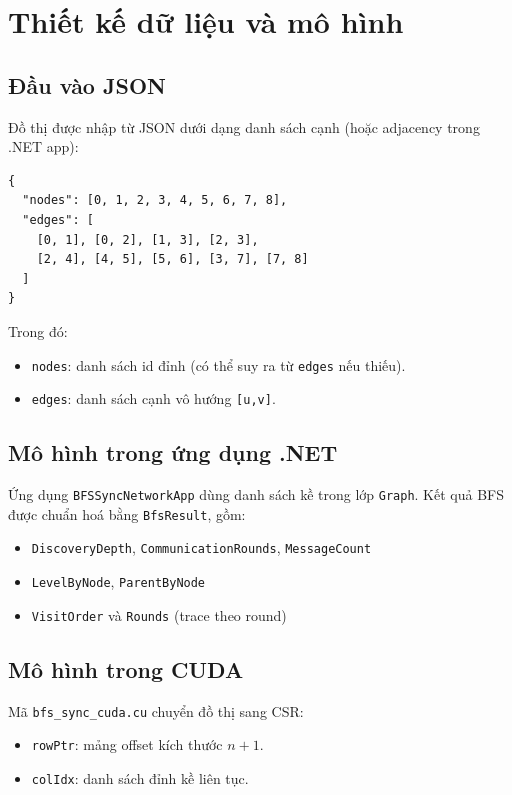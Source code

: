 \documentclass[12pt,a4paper]{article}
\begin{document}
\section{Thiết kế dữ liệu và mô hình}

\subsection{Đầu vào JSON}
Đồ thị được nhập từ JSON dưới dạng danh sách cạnh (hoặc adjacency trong .NET app):
\begin{lstlisting}[language={}, caption={Định dạng JSON đầu vào}]
{
  "nodes": [0, 1, 2, 3, 4, 5, 6, 7, 8],
  "edges": [
    [0, 1], [0, 2], [1, 3], [2, 3],
    [2, 4], [4, 5], [5, 6], [3, 7], [7, 8]
  ]
}
\end{lstlisting}

Trong đó:
\begin{itemize}
    \item \texttt{nodes}: danh sách id đỉnh (có thể suy ra từ \texttt{edges} nếu thiếu).
    \item \texttt{edges}: danh sách cạnh vô hướng \texttt{[u,v]}.
\end{itemize}

\subsection{Mô hình trong ứng dụng .NET}
Ứng dụng \texttt{BFSSyncNetworkApp} dùng danh sách kề trong lớp \texttt{Graph}.
Kết quả BFS được chuẩn hoá bằng \texttt{BfsResult}, gồm:
\begin{itemize}
    \item \texttt{DiscoveryDepth}, \texttt{CommunicationRounds}, \texttt{MessageCount}
    \item \texttt{LevelByNode}, \texttt{ParentByNode}
    \item \texttt{VisitOrder} và \texttt{Rounds} (trace theo round)
\end{itemize}

\subsection{Mô hình trong CUDA}
Mã \texttt{bfs\_sync\_cuda.cu} chuyển đồ thị sang CSR:
\begin{itemize}
    \item \texttt{rowPtr}: mảng offset kích thước $n+1$.
    \item \texttt{colIdx}: danh sách đỉnh kề liên tục.
\end{itemize}
\end{document}
